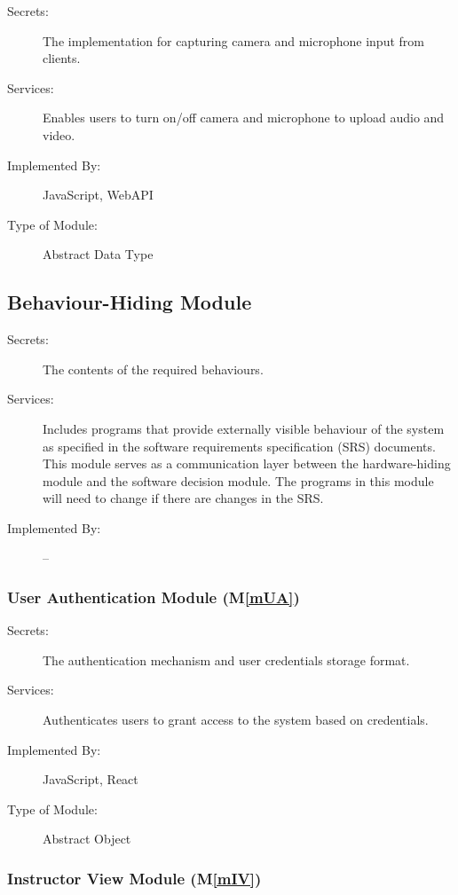 \documentclass[12pt, titlepage]{article}
\newcommand{\mref}[1]{M\ref{#1}}
\begin{document}
\begin{description}
\item[Secrets:]The implementation for capturing camera and microphone input from clients.
\item[Services:]Enables users to turn on/off camera and microphone to upload audio and video.
\item[Implemented By:] JavaScript, WebAPI
\item[Type of Module:] Abstract Data Type
\end{description}

\subsection{Behaviour-Hiding Module}

\begin{description}
\item[Secrets:]The contents of the required behaviours.
\item[Services:]Includes programs that provide externally visible behaviour of
  the system as specified in the software requirements specification (SRS)
  documents. This module serves as a communication layer between the
  hardware-hiding module and the software decision module. The programs in this
  module will need to change if there are changes in the SRS.
\item[Implemented By:] --
\end{description}

\subsubsection{User Authentication Module (\mref{mUA})}

\begin{description}
\item[Secrets:] The authentication mechanism and user credentials storage format.
\item[Services:] Authenticates users to grant access to the system based on credentials.
\item[Implemented By:] JavaScript, React
\item[Type of Module:] Abstract Object
\end{description}

\subsubsection{Instructor View Module (\mref{mIV})}
\end{document}
